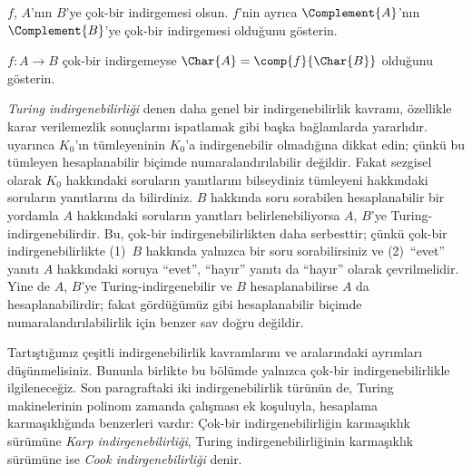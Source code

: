 \documentclass[../../../include/open-logic-section]{subfiles}
\begin{document}
\begin{prob}
$f$, $A$'nın $B$'ye çok-bir indirgemesi olsun. $f$'nin ayrıca
$\Complement{A}$'nın $\Complement{B}$'ye çok-bir indirgemesi olduğunu
gösterin.
\end{prob}

\begin{prob}
$f\colon A\to B$ çok-bir indirgemeyse
$\Char{A}=\comp{f}{\Char{B}}$ olduğunu gösterin.
\end{prob}

\begin{digress}
\emph{Turing indirgenebilirliği} denen daha genel bir indirgenebilirlik
kavramı, özellikle karar verilemezlik sonuçlarını ispatlamak gibi başka
bağlamlarda yararlıdır.  uyarınca $K_0$'ın tümleyeninin
$K_0$'a indirgenebilir olmadığına dikkat edin; çünkü bu tümleyen
hesaplanabilir biçimde numaralandırılabilir değildir. Fakat sezgisel olarak
$K_0$ hakkındaki soruların yanıtlarını bilseydiniz tümleyeni hakkındaki
soruların yanıtlarını da bilirdiniz. $B$ hakkında soru sorabilen
hesaplanabilir bir yordamla $A$ hakkındaki soruların yanıtları
belirlenebiliyorsa $A$, $B$'ye Turing-indirgenebilirdir. Bu, çok-bir
indirgenebilirlikten daha serbesttir; çünkü çok-bir indirgenebilirlikte
(1)~$B$ hakkında yalnızca bir soru sorabilirsiniz ve (2)~``evet'' yanıtı
$A$ hakkındaki soruya ``evet'', ``hayır'' yanıtı da ``hayır'' olarak
çevrilmelidir. Yine de $A$, $B$'ye Turing-indirgenebilir ve $B$
hesaplanabilirse $A$ da hesaplanabilirdir; fakat gördüğümüz gibi hesaplanabilir
biçimde numaralandırılabilirlik için benzer sav doğru değildir.

Tartıştığımız çeşitli indirgenebilirlik kavramlarını ve aralarındaki ayrımları
düşünmelisiniz. Bununla birlikte bu bölümde yalnızca çok-bir
indirgenebilirlikle ilgileneceğiz. Son paragraftaki iki indirgenebilirlik
türünün de, Turing makinelerinin polinom zamanda çalışması ek koşuluyla,
hesaplama karmaşıklığında benzerleri vardır: Çok-bir indirgenebilirliğin
karmaşıklık sürümüne \emph{Karp indirgenebilirliği}, Turing
indirgenebilirliğinin karmaşıklık sürümüne ise \emph{Cook indirgenebilirliği}
denir.
\end{digress}
\end{document}

